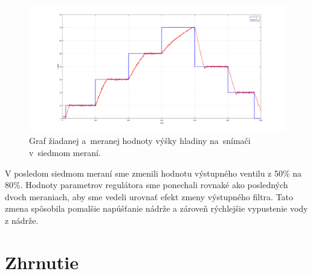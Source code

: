 \documentclass{article}
\begin{document}
\begin{figure}[!htbp]
	\begin{center}
		\includegraphics[width=\textwidth]{./include/meranie7.png}
	\end{center}
	\caption{Graf žiadanej a~meranej hodnoty výšky hladiny na~snímači v~siedmom meraní.}
	\label{fig:m7}
\end{figure}

V posledom siedmom meraní sme zmenili hodnotu výstupného ventilu z 50\% na 80\%. Hodnoty parametrov
regulátora sme ponechali rovnaké ako posledných dvoch meraniach, aby sme vedeli urovnať efekt zmeny
výstupného filtra. Tato zmena spôsobila pomalšie napúšťanie nádrže a zároveň rýchlejšie vypustenie
vody z nádrže.

\clearpage

\section{Zhrnutie}
\label{sec:zhrnutie}
\end{document}
